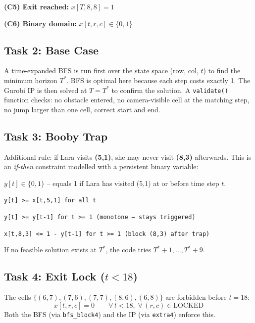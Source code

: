 \documentclass[12pt,a4paper]{article}
\newcommand{\mline}[1]{\par\vspace{2pt}\hspace{1.5em}\texttt{#1}\par\vspace{2pt}}
\begin{document}
\textbf{(C5) Exit reached:} $x[T,8,8]=1$

\textbf{(C6) Binary domain:} $x[t,r,c]\in\{0,1\}$

\subsection*{Task 2: Base Case}

A time-expanded BFS is run first over the state space (row, col, $t$) to find the minimum
horizon $T^*$. BFS is optimal here because each step costs exactly 1. The Gurobi IP is then
solved at $T=T^*$ to confirm the solution. A \texttt{validate()} function checks: no obstacle
entered, no camera-visible cell at the matching step, no jump larger than one cell, correct
start and end.

\subsection*{Task 3: Booby Trap}

Additional rule: if Lara visits \textbf{(5,1)}, she may never visit \textbf{(8,3)} afterwards.
This is an \emph{if-then} constraint modelled with a persistent binary variable:

$y[t]\in\{0,1\}$ -- equals 1 if Lara has visited (5,1) at or before time step $t$.

\mline{y[t]  >=  x[t,5,1]                   for all t}
\mline{y[t]  >=  y[t-1]                      for t >= 1  (monotone -- stays triggered)}
\mline{x[t,8,3]  <=  1 - y[t-1]             for t >= 1  (block (8,3) after trap)}

If no feasible solution exists at $T^*$, the code tries $T^*+1,\dots,T^*+9$.

\subsection*{Task 4: Exit Lock ($t < 18$)}

The cells $\{(6,7),(7,6),(7,7),(8,6),(6,8)\}$ are forbidden before $t=18$:
\[
x[t,r,c]=0 \qquad \forall\,t<18,\;\forall\,(r,c)\in\text{LOCKED}
\]
Both the BFS (via \texttt{bfs\_block4}) and the IP (via \texttt{extra4}) enforce this.

\end{document}
